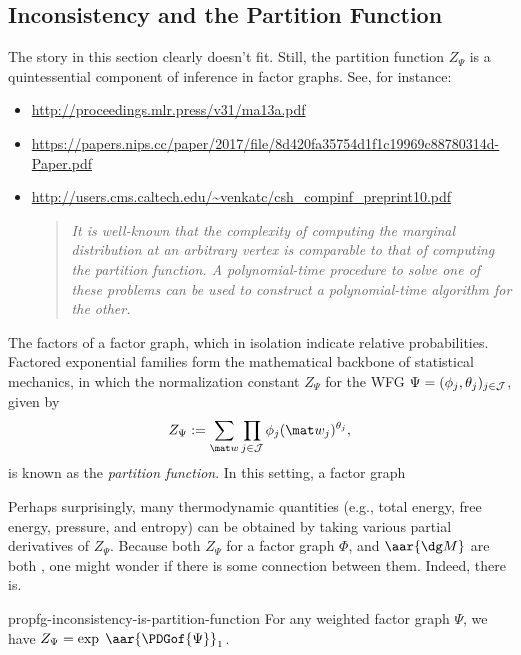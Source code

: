 \subsection{Inconsistency and the Partition Function}
\begin{storynote}
	The story in this section clearly doesn't fit. Still, the partition function $Z_\Psi$ is a quintessential component of inference in factor graphs. See, for instance:
	\begin{itemize}[nosep]
		\item \url{http://proceedings.mlr.press/v31/ma13a.pdf}
		\item {\small\url{https://papers.nips.cc/paper/2017/file/8d420fa35754d1f1c19969c88780314d-Paper.pdf}}
		\item \url{http://users.cms.caltech.edu/~venkatc/csh_compinf_preprint10.pdf}
		\begin{quotation} \small\it\noindent
			It is well-known that the complexity of computing the marginal distribution at an arbitrary vertex is comparable to that of computing the partition function. A polynomial-time procedure to solve one of these problems can be used to construct a polynomial-time algorithm for the other.
		\end{quotation}
	\end{itemize}
\end{storynote}

The factors of a factor graph, which in isolation indicate relative probabilities.
Factored exponential families form the mathematical backbone of statistical
mechanics, in which the normalization constant
$Z_{\Psi}$ for the WFG $\Psi = (\phi_j, \theta_j)_{j \in \cal J}$,
given by
$$
	Z_{\Psi} := \sum_{\mat w} \prod_{j \in \mathcal J} \phi_j(\mat w_j)^{\theta_j}
	,
$$
is known as the \emph{partition function}. In this setting, a factor graph

Perhaps surprisingly, many thermodynamic quantities
(e.g., total energy, free energy, pressure, and entropy) can
be obtained by taking various partial derivatives of $Z_\Psi$.
Because both $Z_{\Psi}$ for a factor graph $\Phi$, and $\aar{\dg M}$ are
both , one might wonder if there is some connection between them. Indeed, there is.

\begin{linked}{prop}{fg-inconsistency-is-partition-function}
	For any weighted factor graph $\Psi$, we have $Z_{\Psi} = \exp\; \aar{\PDGof{\Psi}}_1$.
\end{linked}
